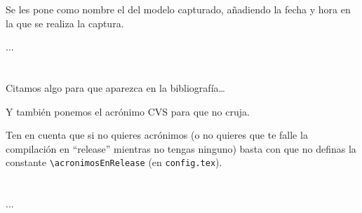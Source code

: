 Se les pone como nombre el  del modelo capturado, añadiendo la fecha y hora en la que se realiza la captura. 

...

\section*{\NotasBibliograficas}
\TocNotasBibliograficas

Citamos algo para que aparezca en la bibliografía\ldots
\citep{ldesc2e}

\medskip

Y también ponemos el acrónimo \ac{CVS} para que no cruja.

Ten en cuenta que si no quieres acrónimos (o no quieres que te falle la compilación en ``release'' mientras no tengas ninguno) basta con que no definas la constante \verb+\acronimosEnRelease+ (en \texttt{config.tex}).


\section*{\ProximoCapitulo}
\TocProximoCapitulo

...

